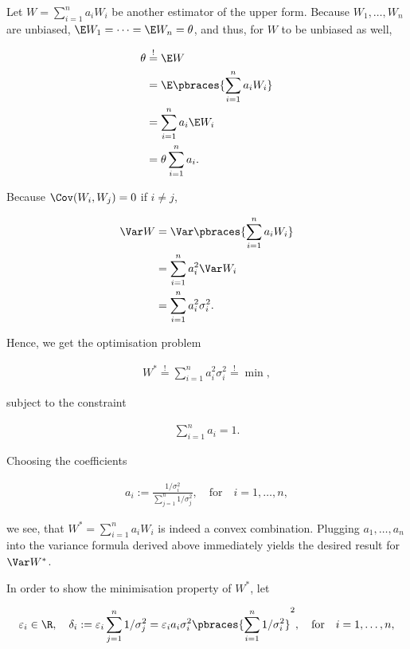 \begin{solution}

Let $W = \sum_{i=1}^n a_i W_i$ be another estimator of the upper form.
Because $W_1, \dots, W_n$ are unbiased, $\E W_1 = \cdots = \E W_n = \theta$, and thus, for $W$ to be unbiased as well,

\begin{align*}
    \theta
    & \stackrel{!}{=}
    \E W \\
    & =
    \E \pbraces{\sum_{i=1}^n a_i W_i} \\
    & =
    \sum_{i=1}^n a_i \E W_i \\
    & =
    \theta \sum_{i=1}^n a_i.
\end{align*}

Because $\Cov(W_i, W_j) = 0$ if $i \neq j$,

\begin{align*}
    \Var W
    & =
    \Var \pbraces{\sum_{i=1}^n a_i W_i} \\
    & =
    \sum_{i=1}^n a_i^2 \Var W_i \\
    & =
    \sum_{i=1}^n a_i^2 \sigma_i^2.
\end{align*}

Hence, we get the optimisation problem

\begin{align*}
    W^\ast
    \stackrel{!}{=}
    \sum_{i=1}^n a_i^2 \sigma_i^2
    \stackrel{!}{=}
    \min,
\end{align*}

subject to the constraint

\begin{align*}
    \sum_{i=1}^n a_i = 1.
\end{align*}

Choosing the coefficients

\begin{align*}
    a_i
    :=
    \frac
    {
        1 / \sigma_i^2
    }{
        \sum_{j=1}^n 1 / \sigma_j^2
    },
    \quad
    \text{for}
    \quad
    i = 1, \dots, n,
\end{align*}

we see, that $W^\ast = \sum_{i=1}^n a_i W_i$ is indeed a convex combination.
Plugging $a_1, \dots, a_n$ into the variance formula derived above immediately yields the desired result for $\Var W^\ast$.

In order to show the minimisation property of $W^\ast$, let

\begin{align*}
    \varepsilon_i \in \R,
    \quad
    \delta_i
    :=
    \varepsilon_i \sum_{j=1}^n 1 / \sigma_j^2
    =
    \varepsilon_i a_i \sigma_i^2 \pbraces{\sum_{i=1}^n 1 / \sigma_i^2}^2,
    \quad
    \text{for}
    \quad
    i = 1, \dots, n,
\end{align*}


\end{solution}
